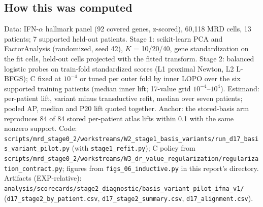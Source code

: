 \subsection*{How this was computed}
{\small\raggedright
Data: IFN-$\alpha$ hallmark panel (92 covered genes, z-scored), 60,118 MRD cells, 13 patients; 7 supported held-out patients. Stage 1: scikit-learn PCA and FactorAnalysis (randomized, seed 42), $K$ = 10/20/40, gene standardization on the fit cells, held-out cells projected with the fitted transform. Stage 2: balanced logistic probes on train-fold standardized scores (L1 proximal Newton, L2 L-BFGS); C fixed at $10^{-4}$ or tuned per outer fold by inner LOPO over the six supported training patients (median inner lift; 17-value grid $10^{-4}$--$10^{4}$). Estimand: per-patient lift, variant minus transductive refit, median over seven patients; pooled AP, median and P20 lift quoted together. Anchor: the stored-basis arm reproduces 84 of 84 stored per-patient atlas lifts within 0.1\pp{} with the same nonzero support. Code: \texttt{scripts/\allowbreak mrd\_stage0\_2/\allowbreak workstreams/\allowbreak W2\_stage1\_\allowbreak basis\_variants/\allowbreak run\_d17\_\allowbreak basis\_variant\_\allowbreak pilot.py} (with \texttt{stage1\_refit.py}); C policy from \texttt{scripts/\allowbreak mrd\_stage0\_2/\allowbreak workstreams/\allowbreak W3\_dr\_\allowbreak value\_\allowbreak regularization/\allowbreak regularization\_\allowbreak contract.py}; figures from \texttt{figs\_06\_inductive.py} in this report's directory. Artifacts (EXP-relative): \texttt{analysis/\allowbreak scorecards/\allowbreak stage2\_\allowbreak diagnostic/\allowbreak basis\_variant\_\allowbreak pilot\_ifna\_v1/} (\texttt{d17\_stage2\_\allowbreak by\_patient.csv}, \texttt{d17\_stage2\_\allowbreak summary.csv}, \texttt{d17\_alignment.csv}). \par}
